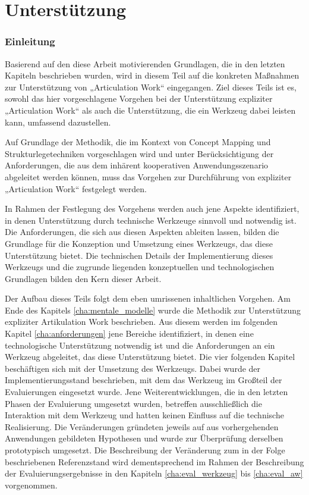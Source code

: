 \part{Unterstützung} %
\label{prt:umsetzung}

\section*{Einleitung} %
\label{sec:umsetzung_einleitung}
\thispagestyle{empty}

Basierend auf den diese Arbeit motivierenden Grundlagen, die in den letzten Kapiteln beschrieben wurden, wird in diesem Teil auf die konkreten Maßnahmen zur Unterstützung von „Articulation Work“ eingegangen. Ziel dieses Teils ist es, sowohl das hier vorgeschlagene Vorgehen bei der Unterstützung expliziter „Articulation Work“ als auch die Unterstützung, die ein Werkzeug dabei leisten kann, umfassend dazustellen.

Auf Grundlage der Methodik, die im Kontext von Concept Mapping und Strukturlegetechniken vorgeschlagen wird und unter Berücksichtigung der Anforderungen, die aus dem inhärent kooperativen Anwendungsszenario abgeleitet werden können, muss das Vorgehen zur Durchführung von expliziter „Articulation Work“ festgelegt werden. 

In Rahmen der Festlegung des Vorgehens werden auch jene Aspekte identifiziert, in denen Unterstützung durch technische Werkzeuge sinnvoll und notwendig ist. Die Anforderungen, die sich aus diesen Aspekten ableiten lassen, bilden die Grundlage für die Konzeption und Umsetzung eines Werkzeugs, das diese Unterstützung bietet. Die technischen Details der Implementierung dieses Werkzeugs und die zugrunde liegenden konzeptuellen und technologischen Grundlagen bilden den Kern dieser Arbeit.

Der Aufbau dieses Teils folgt dem eben umrissenen inhaltlichen Vorgehen. Am Ende des Kapitels \ref{cha:mentale_modelle} wurde die Methodik zur Unterstützung expliziter Artikulation Work beschrieben. Aus diesem werden im folgenden Kapitel \ref{cha:anforderungen} jene Bereiche identifiziert, in denen eine technologische Unterstützung notwendig ist und die Anforderungen an ein Werkzeug abgeleitet, das diese Unterstützung bietet. Die vier folgenden Kapitel beschäftigen sich mit der Umsetzung des Werkzeugs. Dabei wurde der Implementierungsstand beschrieben, mit dem das Werkzeug im Großteil der Evaluierungen eingesetzt wurde. Jene Weiterentwicklungen, die in den letzten Phasen der Evaluierung umgesetzt wurden, betreffen ausschließlich die Interaktion mit dem Werkzeug und hatten keinen Einfluss auf die technische Realisierung. Die Veränderungen gründeten jeweils auf aus vorhergehenden Anwendungen gebildeten Hypothesen und wurde zur Überprüfung derselben prototypisch umgesetzt. Die Beschreibung der Veränderung zum in der Folge beschriebenen Referenzstand wird dementsprechend im Rahmen der Beschreibung der Evaluierungsergebnisse in den Kapiteln \ref{cha:eval_werkzeug} bis \ref{cha:eval_aw} vorgenommen.

